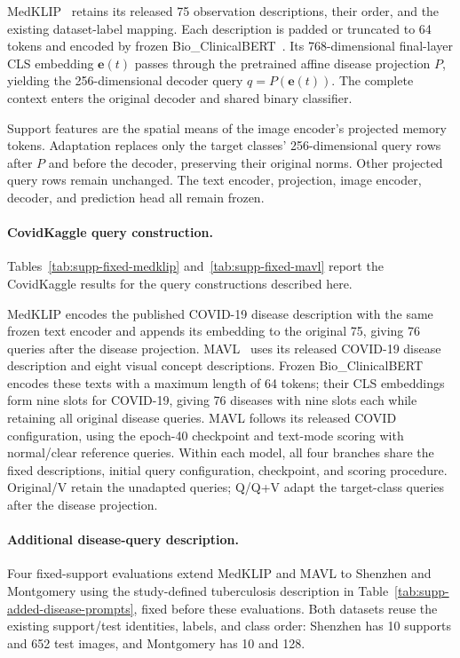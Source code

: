 MedKLIP~\cite{medklip} retains its released 75 observation descriptions, their order, and the existing dataset-label mapping. Each description is padded or truncated to 64 tokens and encoded by frozen Bio\_ClinicalBERT~\cite{alsentzer2019clinicalbert}. Its 768-dimensional final-layer CLS embedding $\mathbf e(t)$ passes through the pretrained affine disease projection $P$, yielding the 256-dimensional decoder query $q=P(\mathbf e(t))$. The complete context enters the original decoder and shared binary classifier.

Support features are the spatial means of the image encoder's projected memory tokens. Adaptation replaces only the target classes' 256-dimensional query rows after $P$ and before the decoder, preserving their original norms. Other projected query rows remain unchanged. The text encoder, projection, image encoder, decoder, and prediction head all remain frozen.

\paragraph{CovidKaggle query construction.}
Tables~\ref{tab:supp-fixed-medklip} and~\ref{tab:supp-fixed-mavl} report the CovidKaggle results for the query constructions described here.

MedKLIP encodes the published COVID-19 disease description with the same frozen text encoder and appends its embedding to the original 75, giving 76 queries after the disease projection. MAVL~\cite{mavl} uses its released COVID-19 disease description and eight visual concept descriptions. Frozen Bio\_ClinicalBERT encodes these texts with a maximum length of 64 tokens; their CLS embeddings form nine slots for COVID-19, giving 76 diseases with nine slots each while retaining all original disease queries. MAVL follows its released COVID configuration, using the epoch-40 checkpoint and text-mode scoring with normal/clear reference queries. Within each model, all four branches share the fixed descriptions, initial query configuration, checkpoint, and scoring procedure. Original/V retain the unadapted queries; Q/Q+V adapt the target-class queries after the disease projection.

\paragraph{Additional disease-query description.}
Four fixed-support evaluations extend MedKLIP and MAVL to Shenzhen and Montgomery using the study-defined tuberculosis description in Table~\ref{tab:supp-added-disease-prompts}, fixed before these evaluations. Both datasets reuse the existing support/test identities, labels, and class order: Shenzhen has 10 supports and 652 test images, and Montgomery has 10 and 128.

